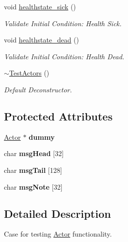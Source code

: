 \begin{DoxyCompactItemize}
void \mbox{\hyperlink{classTestActors_a53e83cec390b5f6052138134caa62c36}{healthstate\+\_\+sick}} ()
\begin{DoxyCompactList}\small\item\em Validate Initial Condition\+: Health Sick. \end{DoxyCompactList}\item 
void \mbox{\hyperlink{classTestActors_a1b8daaf31e1e3f23b53d1fcd9084d939}{healthstate\+\_\+dead}} ()
\begin{DoxyCompactList}\small\item\em Validate Initial Condition\+: Health Dead. \end{DoxyCompactList}\item 
\mbox{\label{classTestActors_ae59d6b6ef13a5da394b2b693473f1e5c}} 
\mbox{\hyperlink{classTestActors_ae59d6b6ef13a5da394b2b693473f1e5c}{$\sim$\+Test\+Actors}} ()
\begin{DoxyCompactList}\small\item\em Default Deconstructor. \end{DoxyCompactList}\end{DoxyCompactItemize}
\subsection*{Protected Attributes}
\begin{DoxyCompactItemize}
\item 
\mbox{\label{classTestActors_aae00ae40e35782157b4853ea153567fd}} 
\mbox{\hyperlink{classActor}{Actor}} $\ast$ {\bfseries dummy}
\item 
\mbox{\label{classTestActors_a3d39ec11c05148cac4e5e81b0dbd83e8}} 
char {\bfseries msg\+Head} \mbox{[}32\mbox{]}
\item 
\mbox{\label{classTestActors_aea378ee27ff93c8c655c604c74bb65cb}} 
char {\bfseries msg\+Tail} \mbox{[}128\mbox{]}
\item 
\mbox{\label{classTestActors_a03e078d6a40690927e50da85e191f6a0}} 
char {\bfseries msg\+Note} \mbox{[}32\mbox{]}
\end{DoxyCompactItemize}


\subsection{Detailed Description}
Case for testing \mbox{\hyperlink{classActor}{Actor}} functionality. 

